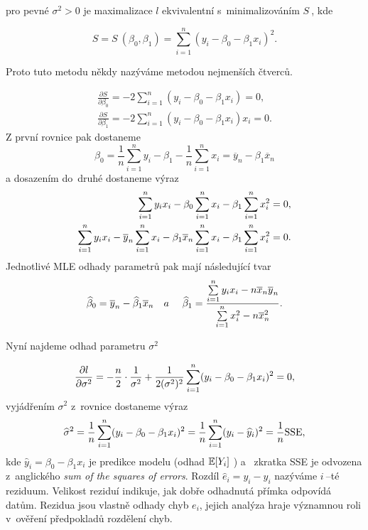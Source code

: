 pro pevné $ \sigma^{2} > 0 $ je maximalizace $ l $ ekvivalentní s~minimalizováním $ S~$, kde

$$
S = S~( \beta_{0} , \beta_{1} ) = \sum_{i = 1}^{n}( y_{i} -  \beta_{0}  - \beta_{1} x_{i})^{2}.
$$

Proto tuto metodu někdy nazýváme metodou nejmenších čtverců.

$$
\begin{aligned}
\frac{\partial S}{\partial \beta_{0}} = - 2 \sum_{i = 1}^{n}( y_{i} -  \beta_{0}  - \beta_{1} x_{i}) = 0 , \\
\frac{\partial S}{\partial \beta_{1}} = - 2 \sum_{i = 1}^{n}( y_{i} -  \beta_{0}  - \beta_{1} x_{i}) x_{i}= 0 .
\end{aligned}
$$
Z první rovnice pak dostaneme
$$
 \beta_{0} = \frac{1}{n} \sum_{i = 1}^{n} y_{i} -  \beta_{1}  - \frac{1}{n} \sum_{i = 1}^{n} x_{i} = \overline{y}_{n} - \beta_{1} \overline{x}_{n}
$$
a dosazením do~druhé dostaneme výraz
$$
\begin{aligned}
\sum\limits_{i=1}^{n} y_{i} x_{i} - \beta_{0} \sum\limits_{i=1}^{n} x_{i} - \beta_{1} \sum\limits_{i=1}^{n} x_{i}^{2} = 0 , \\
\sum\limits_{i=1}^{n} y_{i} x_{i} - \overline{y}_{n} \sum\limits_{i=1}^{n} x_{i} - \beta_{1} \overline{x}_{n} \sum\limits_{i=1}^{n} x_{i} - \beta_{1} \sum\limits_{i=1}^{n} x_{i}^{2} = 0. \\
\end{aligned}
$$
Jednotlivé MLE odhady parametrů pak mají následující tvar
$$
\widehat{\beta}_{0} = \overline{y}_{n} - \widehat{\beta}_{1} \overline{x}_{n} \quad a~\quad
\widehat{\beta}_{1} = \frac{\sum\limits_{i=1}^{n} y_{i} x_{i} - n \overline{x}_{n} \overline{y}_{n}}{\sum\limits_{i=1}^{n} x_{i}^{2} - n \overline{x}_{n}^{2}}.
$$

Nyní najdeme odhad parametru $ \sigma^{2} $ 

$$
\frac{ \partial l}{ \partial \sigma^{2}} = -\frac{n}{2} \cdot \frac{1}{\sigma^{2}} + \frac{1}{2 (\sigma^{2})^{2}} \sum\limits_{i=1}^{n} ( y_{i} -  \beta_{0}  - \beta_{1} x_{i})^{2} = 0,
$$
vyjádřením $ \sigma^{2} $ z~rovnice dostaneme výraz
$$
\widehat{\sigma}^{2} = \frac{1}{n} \sum\limits_{i=1}^{n} ( y_{i} -  \beta_{0}  - \beta_{1} x_{i})^{2} = \frac{1}{n} \sum\limits_{i=1}^{n} ( y_{i} -  \widehat{y}_{i})^{2} = \frac{1}{n} \text{SSE},
$$
kde $ \widehat{y}_{i} = \beta_{0}  - \beta_{1} x_{i} $ je predikce modelu (odhad $ \mathbb{E} [ Y_{i} ] $ ) a~ zkratka SSE je odvozena z~anglického \textit{sum of the squares of errors}. Rozdíl $ \widehat{e}_{i} = y_{i} -  \widehat{y}_{i} $ nazýváme $ i~$--té reziduum. Velikost reziduí indikuje, jak dobře odhadnutá přímka odpovídá datům. Rezidua jsou vlastně odhady chyb $ e_{i} $,  jejich analýza hraje významnou roli v~ověření předpokladů rozdělení chyb.

